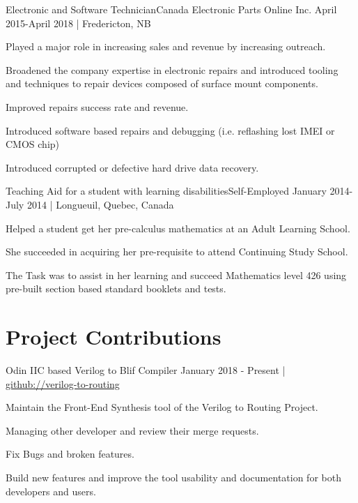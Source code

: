 \documentclass[english]{deedy-resume-openfont}
\begin{document}
    \employement%
        {Electronic and Software Technician}{Canada Electronic Parts Online Inc.}
        {April 2015-April 2018 | Fredericton, NB}{%
        \begin{tightemize}
        \item Played a major role in increasing sales and revenue by increasing outreach.
        \item Broadened the company expertise in electronic repairs and introduced tooling and techniques to repair devices composed of surface mount components.
        \item Improved repairs success rate and revenue.
        \item Introduced software based repairs and debugging (i.e. reflashing lost IMEI or CMOS chip)
        \item Introduced corrupted or defective hard drive data recovery.
        \end{tightemize}
        }

    \employement%
        {Teaching Aid for a student with learning disabilities}{Self-Employed}
        {January 2014-July 2014 | Longueuil, Quebec, Canada}{%
        \begin{tightemize}
        \item Helped a student get her pre-calculus mathematics at an Adult Learning School.
        \item She succeeded in acquiring her pre-requisite to attend Continuing Study School.
        \item The Task was to assist in her learning and succeed Mathematics level 426 using pre-built section based standard booklets and tests.
        \end{tightemize}
        }


\section{Project Contributions}

    \employement%
        {Odin II}{C based Verilog to Blif Compiler}
        {January 2018 - Present | \href{https://github.com/verilog-to-routing/vtr-verilog-to-routing/graphs/contributors}{github://verilog-to-routing}}{%
        Maintain the Front-End Synthesis tool of the Verilog to Routing Project.
        \begin{tightemize}
        \item Managing other developer and review their merge requests.
        \item Fix Bugs and broken features.
        \item Build new features and improve the tool usability and documentation for both developers and users.
        \end{tightemize}
        }
\end{document}
